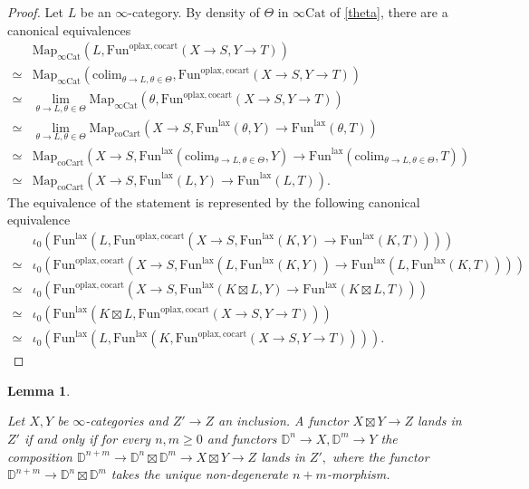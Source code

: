 \documentclass[10pt,oneside]{article}
\numberwithin{equation}{section} %
\numberwithin{figure}{section} %
\theoremstyle{plain}
\newtheorem{lemma}[theorem]{Lemma}
\theoremstyle{definition}
\newcommand{\bD}{{\mathbb D}}
\newcommand{\colim}{\mathrm{colim}}
\newcommand{\Cat}{\mathrm{Cat}}
\newcommand{\Fun}{\mathrm{Fun}}
\newcommand{\cocart}{{\mathrm{cocart}}}
\newcommand{\coCart}{{\mathrm{coCart}}}
\newcommand{\lax}{{\mathrm{lax}}}
\newcommand{\oplax}{{\mathrm{oplax}}}
\newcommand{\Map}{{\mathrm{Map}}}
\begin{document}
\begin{proof}

Let $L $ be an $\infty$-category.
By density of $\Theta$ in $\infty\Cat$ of \cref{theta}, 
there are a canonical equivalences
\begin{align*}
&\Map_{\infty\Cat}(L, \Fun^{\oplax, \cocart}(X \to S, Y \to T))\\
\simeq &\Map_{\infty\Cat}(\colim_{\theta \to L, \theta \in \Theta},  \Fun^{\oplax, \cocart}(X \to S, Y \to T))\\
\simeq &\lim_{\theta \to L, \theta \in \Theta}\Map_{\infty\Cat}(\theta, \Fun^{\oplax, \cocart}(X \to S, Y \to T))\\
\simeq &\lim_{\theta \to L, \theta \in \Theta}\Map_{\coCart}(X \to S, \Fun^\lax(\theta,Y) \to \Fun^\lax(\theta,T))\\
\simeq &\Map_{\coCart}(X \to S, \Fun^\lax(\colim_{\theta \to L, \theta \in \Theta},Y) \to \Fun^\lax(\colim_{\theta \to L, \theta \in \Theta},T))\\
\simeq &\Map_{\coCart}(X \to S, \Fun^\lax(L,Y) \to \Fun^\lax(L,T)).
\end{align*}
The equivalence of the statement is represented by the following canonical equivalence
\begin{align*}
&\iota_0(\Fun^\lax(L, \Fun^{\oplax, \cocart}(X \to S, \Fun^\lax(K,Y) \to \Fun^\lax(K,T))))\\
\simeq &\iota_0(\Fun^{\oplax, \cocart}(X \to S, \Fun^\lax(L,\Fun^\lax(K,Y)) \to \Fun^\lax(L, \Fun^\lax(K,T))  ))\\
\simeq  &\iota_0(\Fun^{\oplax, \cocart}(X \to S, \Fun^\lax(K \boxtimes L, Y) \to \Fun^\lax(K \boxtimes L, T) ))\\
\simeq &\iota_0(\Fun^\lax(K \boxtimes L,\Fun^{\oplax, \cocart}(X \to S,Y \to T)))\\
\simeq &\iota_0(\Fun^\lax(L,\Fun^\lax(K,\Fun^{\oplax, \cocart}(X \to S,Y\to T)))).
\end{align*}
\end{proof}



\begin{lemma}\label{simplo}

Let $X,Y$ be $\infty$-categories and $Z' \to Z$ an inclusion.
A functor $X \boxtimes Y \to Z$ lands in $Z'$
if and only if for every $n,m \geq 0$ and functors $\bD^n \to X, \bD^m \to Y$ the composition $\bD^{n+m} \to \bD^n \boxtimes \bD^m \to X \boxtimes Y \to Z $
lands in $Z',$ where the functor $\bD^{n+m} \to \bD^n \boxtimes \bD^m$ takes the unique non-degenerate $n+m$-morphism.
    
\end{lemma}
\end{document}
